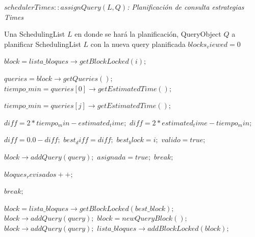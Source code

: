\begin{algorithm}[!th]
\caption{\em $schedulerTimes::assignQuery(L, Q)$: Planificación de consulta estrategias Times}
\label{alg:times}
\begin{algorithmic}[1]
\REQUIRE Una SchedulingList $L$ en donde se hará la planificación, QueryObject $Q$ a planificar
\ENSURE SchedulingList $L$ con la nueva query planificada
	\STATE $blocks_viewed = 0$
	
		\STATE $block = lista\_bloques \rightarrow getBlockLocked(i);$
		
			\STATE $queries = block \rightarrow getQueries();$
			\STATE $tiempo\_min = queries[0] \rightarrow getEstimatedTime();$
			
					\STATE $tiempo\_min = queries[j] \rightarrow getEstimatedTime();$
				\ENDIF
			\ENDFOR
			
				\STATE $diff = 2*tiempo_min - estimated_time;$
			\ELSE
				\STATE $diff = 2*estimated_time - tiempo_min;$
			\ENDIF
			
				\STATE $diff = 0.0-diff;$
					\STATE $best_diff = diff;$
					\STATE $best_block = i;$
				\ENDIF
			\ELSE
				\STATE $valido = true;$
			\ENDIF
			
				\STATE $block \rightarrow addQuery(query);$
				\STATE $asignada = true;$
				\STATE $break;$
			\ENDIF
			
			\STATE $bloques_revisados++;$
			
				\STATE $break;$
			\ENDIF
			
		\ENDIF
		
	\ENDFOR
	
			\STATE $block = lista\_bloques \rightarrow getBlockLocked(best\_block);$
			\STATE $block \rightarrow addQuery(query);$
		\ELSE
			\STATE $block = new QueryBlock();$
			\STATE $block \rightarrow addQuery(query);$
			\STATE $lista\_bloques \rightarrow addBlockLocked(block);$
			
		\ENDIF	
	\ENDIF

\end{algorithmic}
\end{algorithm}




